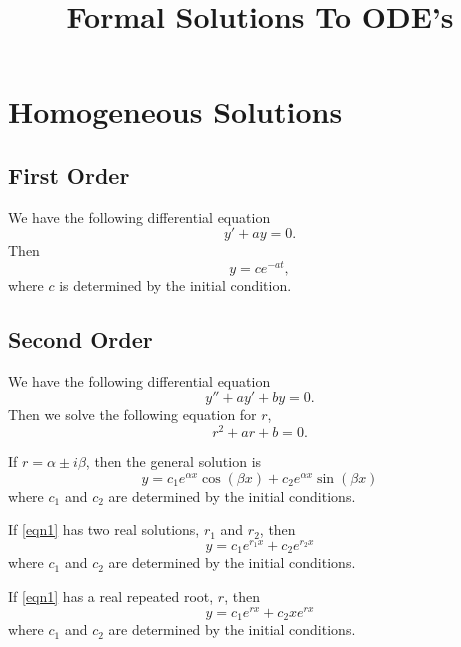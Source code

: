 \documentclass{article}
\title{Formal Solutions To ODE's}
\date{}
\begin{document}
\maketitle

\section{Homogeneous Solutions}

\subsection{First Order}

We have the following differential equation
\[
	y'+ay=0.
\]
Then
\[
	y=c e^{-at},
\]
where $c$ is determined by the initial condition.

\subsection{Second Order}

We have the following differential equation
\begin{equation}
	y''+ay'+by=0. \label{eqn1}
\end{equation}
Then we solve the following equation for $r$,
\[
	r^2+ar+b=0.
\]

If $r=\alpha\pm i\beta$, then the general solution is
\[
	y=c_1 e^{\alpha x}\cos(\beta x)+c_2 e^{\alpha x}\sin(\beta x)
\]
where $c_1$ and $c_2$ are determined by the initial conditions.

If \autoref{eqn1} has two real solutions, $r_1$ and $r_2$, then
\[
	y=c_1e^{r_1 x}+c_2 e^{r_2x}
\]
where $c_1$ and $c_2$ are determined by the initial conditions.

If \autoref{eqn1} has a real repeated root, $r$, then
\[
	y=c_1e^{rx}+c_2xe^{rx}
\]
where $c_1$ and $c_2$ are determined by the initial conditions.
\end{document}
